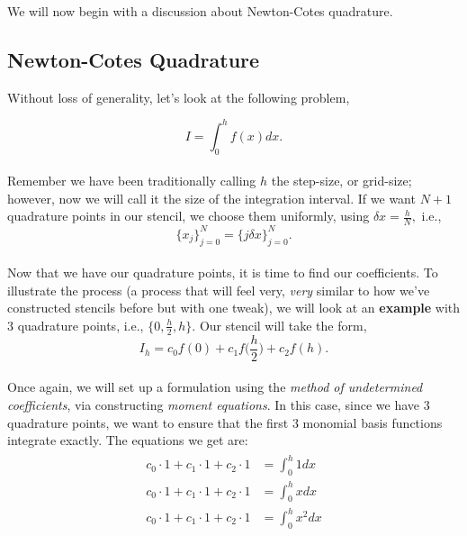\documentclass[paper=a4, fontsize=11pt]{scrartcl} %
\numberwithin{equation}{section} %
\numberwithin{figure}{section} %
\numberwithin{table}{section} %
\begin{document}
We will now begin with a discussion about Newton-Cotes quadrature. \\

%
%
%
%
%
%
\subsection{Newton-Cotes Quadrature}

$ $\\

Without loss of generality, let's look at the following problem, 

$$I = \int_0^h f(x) dx.$$\\

Remember we have been traditionally calling $h$ the step-size, or grid-size; however, now we will call it the size of the integration interval. If we want $N+1$ quadrature points in our stencil, we choose them uniformly, using $\delta x = \frac{h}{N},$ i.e.,\\

 $$\{x_j\}_{j=0}^{N}=\{j\delta x\}_{j=0}^{N}.$$\\

Now that we have our quadrature points, it is time to find our coefficients. To illustrate the process (a process that will feel very, \emph{very} similar to how we've constructed stencils before but with one tweak), we will look at an {\bf{example}} with $3$ quadrature points, i.e., $\{0, \frac{h}{2}, h\}$. Our stencil will take the form, \\

$$I_h = c_0 f(0) + c_1 f\bigg( \frac{h}{2} \bigg) + c_2 f(h).$$\\

Once again, we will set up a formulation using the \emph{method of undetermined coefficients}, via constructing \emph{moment equations}. In this case, since we have $3$ quadrature points, we want to ensure that the first $3$ monomial basis functions integrate exactly. The equations we get are: \\


\begin{align}
\nonumber
\begin{split}
c_0\cdot 1                + c_1\cdot 1               + c_2\cdot 1           &= \int_0^h 1 dx \\
c_0\cdot 1                + c_1\cdot 1               + c_2\cdot 1           &= \int_0^h x dx  \\
c_0\cdot 1                + c_1\cdot 1               + c_2\cdot 1           &= \int_0^h x^2 dx  \\
\end{split}
\end{align}\\
\end{document}
